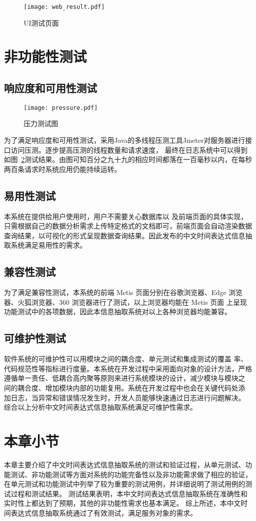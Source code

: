 \begin{figure}[h]
    \centering
    \texttt{[image: web\_result.pdf]}
    \caption{UI测试页面}
    \label{fig:web_result}
\end{figure}

\section{非功能性测试}

\subsection{响应度和可用性测试}

\begin{figure}[b]
    \centering
    \texttt{[image: pressure.pdf]}
    \caption{压力测试图}
    \label{fig:pressure}
\end{figure}

为了满足响应度和可用性测试，采用Java的多线程压测工具Jmeter对服务器进行接口访问压测。逐步提高压测的线程数量和请求速度，
最终在日志系统中可以得到如图~\ref{fig:pressure}测试结果。由图可知百分之九十九的相应时间都落在一百毫秒以内，在每秒两百条请求时系统应用仍能持续运转。


\subsection{易用性测试}

本系统在提供给用户使用时，用户不需要关心数据库以
及前端页面的具体实现，只需根据自己的数据分析需求上传特定格式的文档即可，前端页面会自动渲染数据查询结果，以可视化的形式呈现数据查询结果。因此发布的中文时间表达式信息抽取系统满足易用性的需求。

\subsection{兼容性测试}

为了满足兼容性测试，本系统的前端 Metis 页面分别在谷歌浏览器、Edge
浏览器、火狐浏览器、360 浏览器进行了测试，以上浏览器均能在 Metis 页面
上呈现功能测试中的各项数据，因此本信息抽取系统对以上各种浏览器均能兼容。

\subsection{可维护性测试}

软件系统的可维护性可以用模块之间的耦合度、单元测试和集成测试的覆盖
率、代码规范性等指标进行度量。本系统在开发过程中采用面向对象的设计方法，严格
遵循单一责任、低耦合高内聚等原则来进行系统模块的设计，减少模块与模块之
间的耦合度、增加模块内部的功能复用。系统在开发过程中也会在关键代码处添
加日志，当异常和错误情况发生时，开发人员能够快速通过日志进行问题解决。
综合以上分析中文时间表达式信息抽取系统满足可维护性需求。


\section{本章小节}

本章主要介绍了中文时间表达式信息抽取系统的测试和验证过程，从单元测试、功能测试、非功能测试等方面对系统的功能完备性以及非功能需求做了相应的验证，
在单元测试和功能测试中列举了较为重要的测试用例，并详细说明了测试用例的测试过程和测试结果。
测试结果表明，本中文时间表达式信息抽取系统在准确性和实时性上都达到了预期，其他的非功能性需求也基本满足。
综上所述，本中文时间表达式信息抽取系统通过了有效测试，满足服务对象的需求。